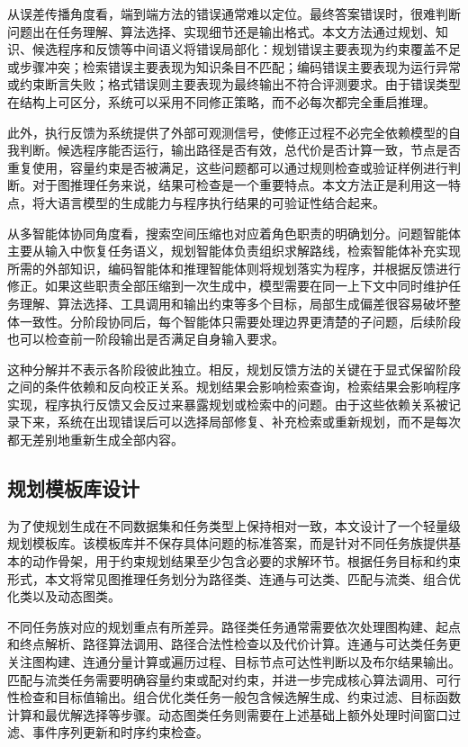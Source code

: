 从误差传播角度看，端到端方法的错误通常难以定位。最终答案错误时，很难判断问题出在任务理解、算法选择、实现细节还是输出格式。本文方法通过规划、知识、候选程序和反馈等中间语义将错误局部化：规划错误主要表现为约束覆盖不足或步骤冲突；检索错误主要表现为知识条目不匹配；编码错误主要表现为运行异常或约束断言失败；格式错误则主要表现为最终输出不符合评测要求。由于错误类型在结构上可区分，系统可以采用不同修正策略，而不必每次都完全重启推理。

此外，执行反馈为系统提供了外部可观测信号，使修正过程不必完全依赖模型的自我判断。候选程序能否运行，输出路径是否有效，总代价是否计算一致，节点是否重复使用，容量约束是否被满足，这些问题都可以通过规则检查或验证样例进行判断。对于图推理任务来说，结果可检查是一个重要特点。本文方法正是利用这一特点，将大语言模型的生成能力与程序执行结果的可验证性结合起来。

从多智能体协同角度看，搜索空间压缩也对应着角色职责的明确划分。问题智能体主要从输入中恢复任务语义，规划智能体负责组织求解路线，检索智能体补充实现所需的外部知识，编码智能体和推理智能体则将规划落实为程序，并根据反馈进行修正。如果这些职责全部压缩到一次生成中，模型需要在同一上下文中同时维护任务理解、算法选择、工具调用和输出约束等多个目标，局部生成偏差很容易破坏整体一致性。分阶段协同后，每个智能体只需要处理边界更清楚的子问题，后续阶段也可以检查前一阶段输出是否满足自身输入要求。

这种分解并不表示各阶段彼此独立。相反，规划反馈方法的关键在于显式保留阶段之间的条件依赖和反向校正关系。规划结果会影响检索查询，检索结果会影响程序实现，程序执行反馈又会反过来暴露规划或检索中的问题。由于这些依赖关系被记录下来，系统在出现错误后可以选择局部修复、补充检索或重新规划，而不是每次都无差别地重新生成全部内容。

\subsection{规划模板库设计}

为了使规划生成在不同数据集和任务类型上保持相对一致，本文设计了一个轻量级规划模板库。该模板库并不保存具体问题的标准答案，而是针对不同任务族提供基本的动作骨架，用于约束规划结果至少包含必要的求解环节。根据任务目标和约束形式，本文将常见图推理任务划分为路径类、连通与可达类、匹配与流类、组合优化类以及动态图类。

不同任务族对应的规划重点有所差异。路径类任务通常需要依次处理图构建、起点和终点解析、路径算法调用、路径合法性检查以及代价计算。连通与可达类任务更关注图构建、连通分量计算或遍历过程、目标节点可达性判断以及布尔结果输出。匹配与流类任务需要明确容量约束或配对约束，并进一步完成核心算法调用、可行性检查和目标值输出。组合优化类任务一般包含候选解生成、约束过滤、目标函数计算和最优解选择等步骤。动态图类任务则需要在上述基础上额外处理时间窗口过滤、事件序列更新和时序约束检查。

